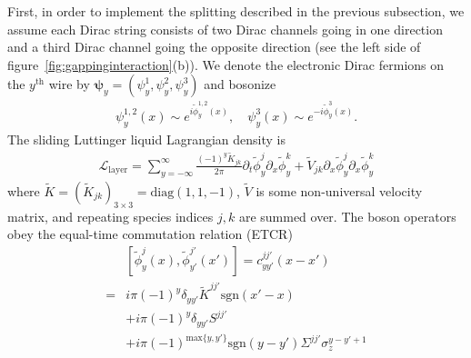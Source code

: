 First, in order to implement the splitting described in the previous subsection, we assume each Dirac string consists of two Dirac channels going in one direction and a third Dirac channel going the opposite direction (see the left side of figure~\ref{fig:gappinginteraction}(b)). We denote the electronic Dirac fermions on the $y^{\mathrm{th}}$ wire by $\boldsymbol\psi_y=(\psi_y^1,\psi_y^2,\psi_y^3)$ and bosonize \begin{align}\psi_y^{1,2}(x)\sim e^{i\tilde\phi^{1,2}_y(x)},\quad\psi_y^3(x)\sim e^{-i\tilde\phi^3_y(x)}.\label{bosondef}\end{align} The sliding Luttinger liquid\cite{OHernLubenskyToner99,EmeryFradkinKivelsonLubensky00,VishwanathCarpentier01,SondhiYang01,MukhopadhyayKaneLubensky01} Lagrangian density is \begin{align}\mathcal{L}_{\mathrm{layer}}=\sum_{y=-\infty}^\infty\frac{(-1)^y\tilde{K}_{jk}}{2\pi}\partial_t\tilde\phi_y^j\partial_x\tilde\phi_y^k+\tilde{V}_{jk}\partial_x\tilde\phi_y^j\partial_x\tilde\phi_y^k\label{Llayer}\end{align} where $\tilde{K}=(\tilde{K}_{jk})_{3\times3}=\mathrm{diag}(1,1,-1)$, $\tilde{V}$ is some non-universal velocity matrix, and repeating species indices $j,k$ are summed over. The boson operators obey the equal-time commutation relation (\hypertarget{ETCR}{ETCR}) \begin{align}&\left[\tilde\phi_y^j(x),\tilde\phi_{y'}^{j'}(x')\right]=c^{jj'}_{yy'}(x-x')\nonumber\\=&i\pi(-1)^y\delta_{yy'}\tilde{K}^{jj'}\mathrm{sgn}(x'-x)\label{ETcomm0}\\&+i\pi(-1)^y\delta_{yy'}S^{jj'}\nonumber\\&+i\pi(-1)^{\mathrm{max}\{y,y'\}}\mathrm{sgn}(y-y')\Sigma^{jj'}\sigma_z^{y-y'+1}\nonumber\end{align}
